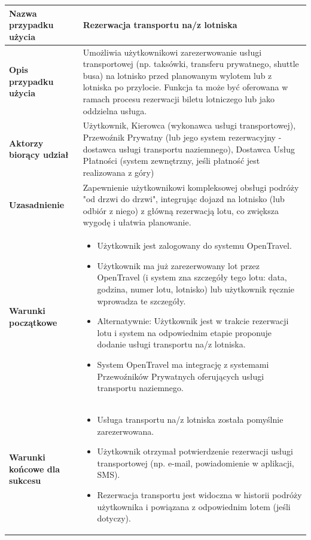 \documentclass[a4paper,12pt]{article}
\begin{document}
\begin{longtable}{|p{\pierwszakolumnaszerokoscPUBLRezTransLot}|p{\drugakolumnaszerokoscPUBLRezTransLot}|}
    \textbf{Nazwa przypadku użycia} & Rezerwacja transportu na/z lotniska \\
    \hline
    \textbf{Opis przypadku użycia} & Umożliwia użytkownikowi zarezerwowanie usługi transportowej (np. taksówki, transferu prywatnego, shuttle busa) na lotnisko przed planowanym wylotem lub z lotniska po przylocie. Funkcja ta może być oferowana w ramach procesu rezerwacji biletu lotniczego lub jako oddzielna usługa. \\
    \hline
    \textbf{Aktorzy biorący udział} & Użytkownik, Kierowca (wykonawca usługi transportowej), Przewoźnik Prywatny (lub jego system rezerwacyjny - dostawca usługi transportu naziemnego), Dostawca Usług Płatności (system zewnętrzny, jeśli płatność jest realizowana z góry) \\
    \hline
    \textbf{Uzasadnienie} & Zapewnienie użytkownikowi kompleksowej obsługi podróży "od drzwi do drzwi", integrując dojazd na lotnisko (lub odbiór z niego) z główną rezerwacją lotu, co zwiększa wygodę i ułatwia planowanie. \\
    \hline
    \textbf{Warunki początkowe} &
        \begin{itemize} \itemsep0pt \parskip0pt \parsep0pt
            \item Użytkownik jest zalogowany do systemu OpenTravel.
            \item Użytkownik ma już zarezerwowany lot przez OpenTravel (i system zna szczegóły tego lotu: data, godzina, numer lotu, lotnisko) lub użytkownik ręcznie wprowadza te szczegóły.
            \item Alternatywnie: Użytkownik jest w trakcie rezerwacji lotu i system na odpowiednim etapie proponuje dodanie usługi transportu na/z lotniska.
            \item System OpenTravel ma integrację z systemami Przewoźników Prywatnych oferujących usługi transportu naziemnego.
        \end{itemize} \\
    \hline
    \textbf{Warunki końcowe dla sukcesu} &
        \begin{itemize} \itemsep0pt \parskip0pt \parsep0pt
            \item Usługa transportu na/z lotniska została pomyślnie zarezerwowana.
            \item Użytkownik otrzymał potwierdzenie rezerwacji usługi transportowej (np. e-mail, powiadomienie w aplikacji, SMS).
            \item Rezerwacja transportu jest widoczna w historii podróży użytkownika i powiązana z odpowiednim lotem (jeśli dotyczy).

\end{itemize}
\end{longtable}
\end{document}
